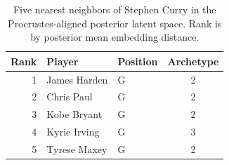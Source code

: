\begin{table}[htbp]
  \centering\small
  \begin{tabular}{rllc}
    \toprule
    Rank & Player & Position & Archetype \\
    \midrule
    1 & James Harden & G & 2 \\
    2 & Chris Paul & G & 2 \\
    3 & Kobe Bryant & G & 2 \\
    4 & Kyrie Irving & G & 3 \\
    5 & Tyrese Maxey & G & 2 \\
    \bottomrule
  \end{tabular}
  \caption{Five nearest neighbors of Stephen Curry in the Procrustes-aligned posterior latent space. Rank is by posterior mean embedding distance.}
  \label{tab:Stephen_Curry_neighbors}
\end{table}

